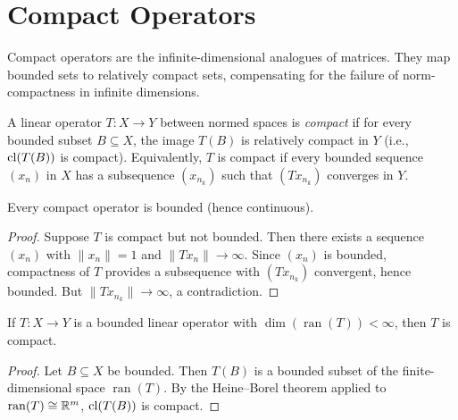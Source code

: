 \documentclass[11pt,a4paper]{article}
\begin{document}

\section{Compact Operators}
\label{sec:compact_ops}

Compact operators are the infinite-dimensional analogues of matrices.
They map bounded sets to relatively compact sets, compensating for
the failure of norm-compactness in infinite dimensions.

\begin{definition}
\label{def:compact_op}
A linear operator $T \colon X \to Y$ between normed spaces is \emph{compact}
if for every bounded subset $B \subseteq X$, the image $T(B)$ is relatively
compact in $Y$ (i.e., $\operatorname{cl}(T(B))$ is compact). Equivalently, $T$ is compact
if every bounded sequence $(x_n)$ in $X$ has a subsequence $(x_{n_k})$ such
that $(Tx_{n_k})$ converges in $Y$.
\end{definition}

\begin{proposition}
\label{prop:compact_bounded}
Every compact operator is bounded (hence continuous).
\end{proposition}

\begin{proof}
Suppose $T$ is compact but not bounded. Then there exists a sequence $(x_n)$
with $\|x_n\| = 1$ and $\|Tx_n\| \to \infty$. Since $(x_n)$ is bounded,
compactness of $T$ provides a subsequence with $(Tx_{n_k})$ convergent, hence
bounded. But $\|Tx_{n_k}\| \to \infty$, a contradiction.
\end{proof}

\begin{proposition}
\label{prop:finite_rank_compact}
If $T \colon X \to Y$ is a bounded linear operator with
$\dim(\operatorname{ran}(T)) < \infty$, then $T$ is compact.
\end{proposition}

\begin{proof}
Let $B \subseteq X$ be bounded. Then $T(B)$ is a bounded subset of the
finite-dimensional space $\operatorname{ran}(T)$. By the Heine--Borel theorem
applied to $\operatorname{ran}(T) \cong \mathbb{R}^m$, $\operatorname{cl}(T(B))$ is compact.
\end{proof}
\end{document}
